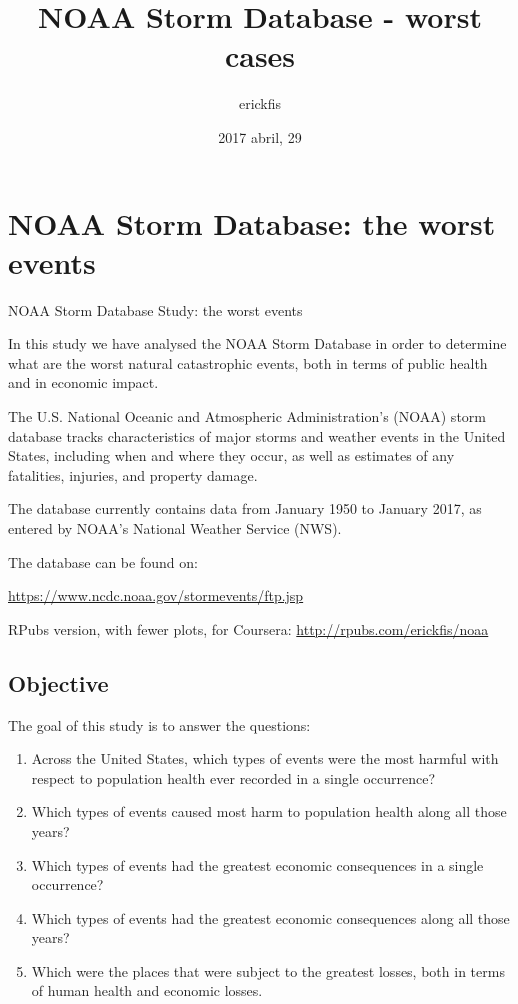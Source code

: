 \documentclass[]{article}
\title{NOAA Storm Database - worst cases}
\author{erickfis}
\date{2017 abril, 29}
\begin{document}
\maketitle

{
\setcounter{tocdepth}{3}
\tableofcontents
}
\section{NOAA Storm Database: the worst
events}\label{noaa-storm-database-the-worst-events}

NOAA Storm Database Study: the worst events

In this study we have analysed the NOAA Storm Database in order to
determine what are the worst natural catastrophic events, both in terms
of public health and in economic impact.

The U.S. National Oceanic and Atmospheric Administration's (NOAA) storm
database tracks characteristics of major storms and weather events in
the United States, including when and where they occur, as well as
estimates of any fatalities, injuries, and property damage.

The database currently contains data from January 1950 to January 2017,
as entered by NOAA's National Weather Service (NWS).

The database can be found on:

\url{https://www.ncdc.noaa.gov/stormevents/ftp.jsp}

RPubs version, with fewer plots, for Coursera:
\url{http://rpubs.com/erickfis/noaa}

\subsection{Objective}\label{objective}

The goal of this study is to answer the questions:

\begin{enumerate}
\def\labelenumi{\arabic{enumi}.}
\item
  Across the United States, which types of events were the most harmful
  with respect to population health ever recorded in a single
  occurrence?
\item
  Which types of events caused most harm to population health along all
  those years?
\item
  Which types of events had the greatest economic consequences in a
  single occurrence?
\item
  Which types of events had the greatest economic consequences along all
  those years?
\item
  Which were the places that were subject to the greatest losses, both
  in terms of human health and economic losses.
\end{enumerate}
\end{document}

